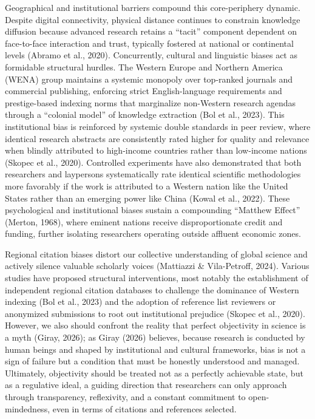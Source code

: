 \documentclass[year=2026]{cup-journal}
\begin{document}
Geographical and institutional barriers compound this core-periphery dynamic. Despite digital connectivity, physical distance continues to constrain knowledge diffusion because advanced research retains a “tacit” component dependent on face-to-face interaction and trust, typically fostered at national or continental levels (Abramo et al., 2020). Concurrently, cultural and linguistic biases act as formidable structural hurdles. The Western Europe and Northern America (WENA) group maintains a systemic monopoly over top-ranked journals and commercial publishing, enforcing strict English-language requirements and prestige-based indexing norms that marginalize non-Western research agendas through a “colonial model” of knowledge extraction (Bol et al., 2023). This institutional bias is reinforced by systemic double standards in peer review, where identical research abstracts are consistently rated higher for quality and relevance when blindly attributed to high-income countries rather than low-income nations (Skopec et al., 2020). Controlled experiments have also demonstrated that both researchers and laypersons systematically rate identical scientific methodologies more favorably if the work is attributed to a Western nation like the United States rather than an emerging power like China (Kowal et al., 2022). These psychological and institutional biases sustain a compounding “Matthew Effect” (Merton, 1968), where eminent nations receive disproportionate credit and funding, further isolating researchers operating outside affluent economic zones.

Regional citation biases distort our collective understanding of global science and actively silence valuable scholarly voices (Mattiazzi \& Vila-Petroff, 2024). Various studies have proposed structural interventions, most notably the establishment of independent regional citation databases to challenge the dominance of Western indexing (Bol et al., 2023) and the adoption of reference list reviewers or anonymized submissions to root out institutional prejudice (Skopec et al., 2020). However, we also should confront the reality that perfect objectivity in science is a myth (Giray, 2026); as Giray (2026) believes, because research is conducted by human beings and shaped by institutional and cultural frameworks, bias is not a sign of failure but a condition that must be honestly understood and managed. Ultimately, objectivity should be treated not as a perfectly achievable state, but as a regulative ideal, a guiding direction that researchers can only approach through transparency, reflexivity, and a constant commitment to open-mindedness, even in terms of citations and references selected.
\end{document}
